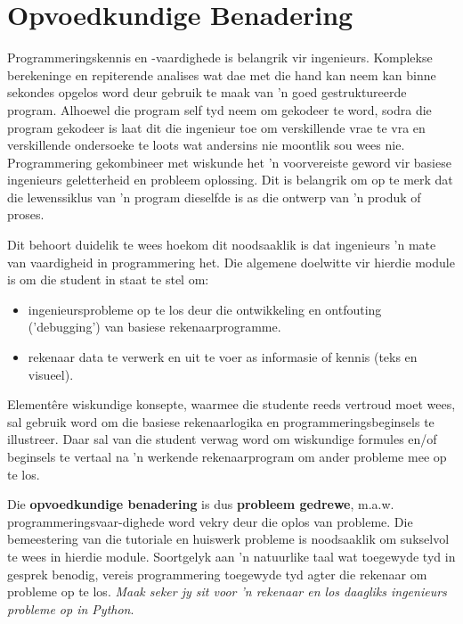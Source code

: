 \section{Opvoedkundige Benadering}
Programmeringskennis en -vaardighede is belangrik vir
ingenieurs. Komplekse berekeninge en repiterende analises wat dae met
die hand kan neem kan binne sekondes opgelos word deur gebruik te maak
van 'n goed gestruktureerde program. Alhoewel die program self tyd
neem om gekodeer te word, sodra die program gekodeer is laat dit die
ingenieur toe om verskillende vrae te vra en verskillende ondersoeke
te loots wat andersins nie moontlik sou wees nie. Programmering
gekombineer met wiskunde het 'n voorvereiste geword vir basiese
ingenieurs geletterheid en probleem oplossing. Dit is belangrik om op
te merk dat die lewenssiklus van 'n program dieselfde is as die
ontwerp van 'n produk of proses.

Dit behoort duidelik te wees hoekom dit noodsaaklik is dat ingenieurs
'n mate van vaardigheid in programmering het. Die algemene doelwitte
vir hierdie module is om die student in staat te stel om:
    \begin{itemize}
    \item ingenieursprobleme op te los deur die ontwikkeling en ontfouting
      ('debugging') van basiese rekenaarprogramme.
    \item rekenaar data te verwerk en uit te voer as informasie of
      kennis (teks en visueel).
    \end{itemize}

    Element\^{e}re wiskundige konsepte, waarmee die studente reeds vertroud 
    moet wees, sal gebruik word om die basiese rekenaarlogika en 
    programmeringsbeginsels 
    te illustreer. Daar sal van die student verwag word om 
    wiskundige formules en/of beginsels te vertaal na 'n werkende 
    rekenaarprogram
    om ander probleme mee op te los.

    Die \textbf{opvoedkundige benadering} is dus \textbf{probleem
      gedrewe}, m.a.w.  programmeringsvaar-dighede word vekry deur die
    oplos van probleme. Die bemeestering van die tutoriale en huiswerk
    probleme is noodsaaklik om sukselvol te wees in hierdie
    module. Soortgelyk aan 'n natuurlike taal wat toegewyde tyd in
    gesprek benodig, vereis programmering toegewyde tyd agter die
    rekenaar om probleme op te los. \textit{Maak seker jy sit voor 'n
      rekenaar en los daagliks ingenieurs probleme op in Python}.
    
